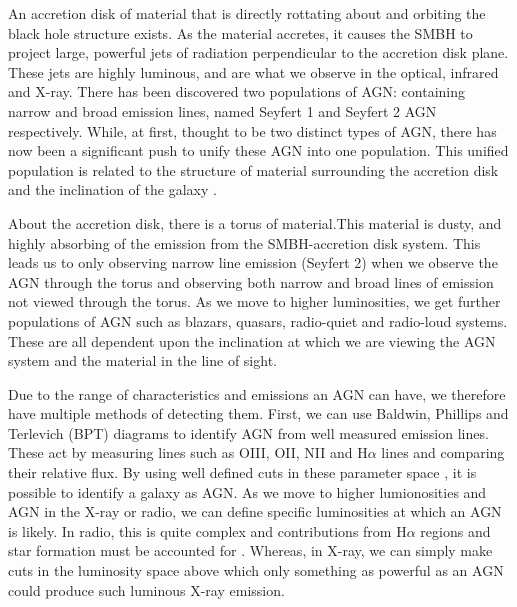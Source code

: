 An accretion disk of material that is directly rottating about and orbiting the black hole structure exists. As the material accretes, it causes the SMBH to project large, powerful jets of radiation perpendicular to the accretion disk plane. These jets are highly luminous, and are what we observe in the optical, infrared and X-ray. There has been discovered two populations of AGN: containing narrow and broad emission lines, named Seyfert 1 and Seyfert 2 AGN respectively. While, at first, thought to be two distinct types of AGN, there has now been a significant push to unify these AGN into one population. This unified population is related to the structure of material surrounding the accretion disk and the inclination of the galaxy \citep[for a review of the unification, see][]{2015ARA&A..53..365N}.

About the accretion disk, there is a torus of material.This material is dusty, and highly absorbing of the emission from the SMBH-accretion disk system. This leads us to only observing narrow line emission (Seyfert 2) when we observe the AGN through the torus and observing both narrow and broad lines of emission not viewed through the torus. As we move to higher luminosities, we get further populations of AGN such as blazars, quasars, radio-quiet and radio-loud systems. These are all dependent upon the inclination at which we are viewing the AGN system and the material in the line of sight.

Due to the range of characteristics and emissions an AGN can have, we therefore have multiple methods of detecting them. First, we can use Baldwin, Phillips and Terlevich (BPT) diagrams to identify AGN from well measured emission lines. These act by measuring lines such as OIII, OII, NII and H$\alpha$ lines and comparing their relative flux. By using well defined cuts in these parameter space \citep{Paper that gives those cuts. It's Kennedy and Ho or something like this}, it is possible to identify a galaxy as AGN. As we move to higher lumionosities and AGN in the X-ray or radio, we can define specific luminosities at which an AGN is likely. In radio, this is quite complex and contributions from H$\alpha$ regions and star formation must be accounted for \citep{Paper on radio AGN identification}. Whereas, in X-ray, we can simply make cuts in the luminosity space above which only something as powerful as an AGN could produce such luminous X-ray emission.

